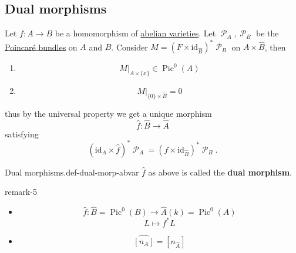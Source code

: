 \documentclass[10pt,]{book}
\newcommand{\terminology}[1]{\textbf{#1}}
\numberwithin{equation}{section}
\newcommand{\sheaf}[1]{\operatorname{\mathcal{#1}}}
\newcommand{\lb}{[}
\newcommand{\rb}{]}
\newcommand{\id}{\mathrm{id}}
\DeclareMathOperator{\Pic}{Pic}
\begin{document}
\subsection[{Dual morphisms}]{Dual morphisms}\label{subsection-23}
\hypertarget{p-195}{}%
Let \(f\colon A\to B\) be a homomorphism of \hyperref[def-buntes-abvar]{abelian varieties}. Let \(\sheaf P_A,\sheaf P_B\) be the \hyperref[thm-poincare-bundle]{Poincaré bundles} on  \(A\) and \(B\). Consider \(M=    (F\times \id_{\hat B})^* \sheaf P_B\) on \(A\times \hat B\), then\leavevmode%
\begin{enumerate}
\item\hypertarget{li-38}{}%
\begin{equation*}
M|_{A\times \{x\}} \in \Pic^0(A)
\end{equation*}
%
\item\hypertarget{li-39}{}%
\begin{equation*}
M|_{\{0\} \times \hat B} = 0
\end{equation*}
%
\end{enumerate}
thus by the universal property we get a unique morphism%
\begin{equation*}
\hat f\colon \hat B \to \hat A
\end{equation*}
satisfying%
\begin{equation*}
(\id_A\times \hat f)^* \sheaf P_A = (f\times \id_{\hat B})^*\sheaf P_B\text{.}
\end{equation*}
%
\begin{definition}{Dual morphisms.}{def-dual-morp-abvar}%
\hypertarget{p-196}{}%
\(\hat f\) as above is called the \terminology{dual morphism}.%
\end{definition}
\begin{remark}{}{remark-5}%
\hypertarget{p-197}{}%
\leavevmode%
\begin{itemize}[label=\textbullet]
\item{}%
\begin{equation*}
\hat f\colon \hat B = \Pic^0(B) \to \hat A(k) = \Pic^0(A)
\end{equation*}
%
\begin{equation*}
L\mapsto f^*L
\end{equation*}
%
\item{}%
\begin{equation*}
\hat{\lb n_A\rb} = [n_{\hat A}]
\end{equation*}
%
\end{itemize}
%
\end{remark}
\hypertarget{p-198}{}%
\end{document}
